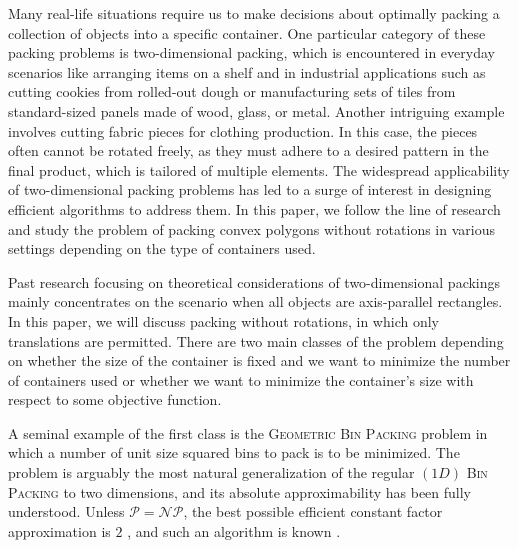 \documentclass[a4paper,UKenglish,cleveref, autoref, thm-restate]{lipics_v2021}
\begin{document}




Many real-life situations require us to make decisions about optimally packing a collection of objects into a specific container. One particular category of these packing problems is two-dimensional packing, which is encountered in everyday scenarios like arranging items on a shelf and in industrial applications such as cutting cookies from rolled-out dough or manufacturing sets of tiles from standard-sized panels made of wood, glass, or metal. Another intriguing example involves cutting fabric pieces for clothing production. In this case, the pieces often cannot be rotated freely, as they must adhere to a desired pattern in the final product, which is tailored of multiple elements.
%
The widespread applicability of two-dimensional packing problems has led to a surge of interest in designing efficient algorithms to address them. In this paper, we follow the line of research and study the problem of packing convex polygons without rotations in various settings depending on the type of containers used. 

Past research focusing on theoretical considerations of two-dimensional packings mainly concentrates on the scenario when all objects are axis-parallel rectangles. In this paper, we will discuss packing without rotations, in which only translations are permitted.
There are two main classes of the problem depending on whether the size of the container is fixed and we want to minimize the number of containers used or whether we want to minimize the container's size with respect to some objective function. 

A seminal example of the first class is the \textsc{Geometric Bin Packing} problem in which a number of unit size squared bins to pack is to be minimized. The problem is arguably the most natural generalization of the regular $(1D)$ \textsc{Bin Packing} to two dimensions, and its absolute approximability has been fully understood. Unless $\mathcal{P} = \mathcal{NP}$, the best possible efficient constant factor approximation is $2$ \cite{leung}, and such an algorithm is known \cite{harren_vanstee}.
\end{document}
